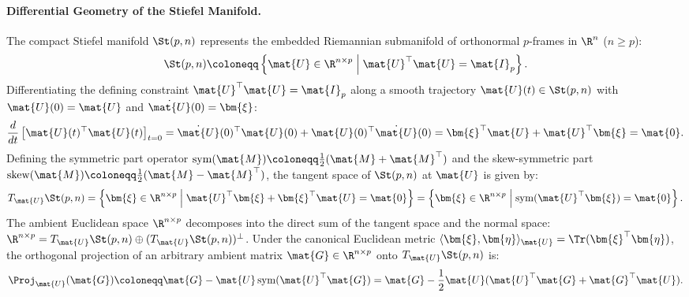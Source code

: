 \paragraph{Differential Geometry of the Stiefel Manifold.}
The compact Stiefel manifold $\St(p, n)$ represents the embedded Riemannian submanifold of orthonormal $p$-frames in $\R^n$ ($n \ge p$):
\begin{equation}
\St(p, n) \coloneqq \left\{ \mat{U} \in \R^{n \times p} \;\middle|\; \mat{U}^\top \mat{U} = \mat{I}_p \right\}.
\label{eq:app_stiefel_def}
\end{equation}
Differentiating the defining constraint $\mat{U}^\top \mat{U} = \mat{I}_p$ along a smooth trajectory $\mat{U}(t) \in \St(p, n)$ with $\mat{U}(0) = \mat{U}$ and $\dot{\mat{U}}(0) = \bm{\xi}$:
\begin{equation}
\frac{d}{dt}\left[ \mat{U}(t)^\top \mat{U}(t) \right]_{t=0} = \dot{\mat{U}}(0)^\top \mat{U}(0) + \mat{U}(0)^\top \dot{\mat{U}}(0) = \bm{\xi}^\top \mat{U} + \mat{U}^\top \bm{\xi} = \mat{0}.
\end{equation}
Defining the symmetric part operator $\operatorname{sym}(\mat{M}) \coloneqq \frac{1}{2}(\mat{M} + \mat{M}^\top)$ and the skew-symmetric part $\operatorname{skew}(\mat{M}) \coloneqq \frac{1}{2}(\mat{M} - \mat{M}^\top)$, the tangent space of $\St(p, n)$ at $\mat{U}$ is given by:
\begin{equation}
T_{\mat{U}} \St(p, n) = \left\{ \bm{\xi} \in \R^{n \times p} \;\middle|\; \mat{U}^\top \bm{\xi} + \bm{\xi}^\top \mat{U} = \mat{0} \right\} = \left\{ \bm{\xi} \in \R^{n \times p} \;\middle|\; \operatorname{sym}(\mat{U}^\top \bm{\xi}) = \mat{0} \right\}.
\label{eq:stiefel_tangent_space}
\end{equation}
The ambient Euclidean space $\R^{n \times p}$ decomposes into the direct sum of the tangent space and the normal space: $\R^{n \times p} = T_{\mat{U}} \St(p, n) \oplus (T_{\mat{U}} \St(p, n))^\perp$.
Under the canonical Euclidean metric $\langle \bm{\xi}, \bm{\eta} \rangle_{\mat{U}} = \Tr(\bm{\xi}^\top \bm{\eta})$, the orthogonal projection of an arbitrary ambient matrix $\mat{G} \in \R^{n \times p}$ onto $T_{\mat{U}} \St(p, n)$ is:
\begin{equation}
\Proj_{\mat{U}}(\mat{G}) \coloneqq \mat{G} - \mat{U} \operatorname{sym}(\mat{U}^\top \mat{G}) = \mat{G} - \frac{1}{2} \mat{U} (\mat{U}^\top \mat{G} + \mat{G}^\top \mat{U}).
\label{eq:stiefel_tangent_projector}
\end{equation}


